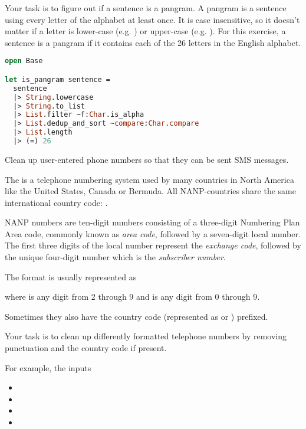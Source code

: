 Your task is to figure out if a sentence is a pangram.
A pangram is a sentence using every letter of the alphabet at least once.
It is case insensitive, so it doesn't matter if a letter is lower-case (e.g. ) or upper-case (e.g. ).
For this exercise, a sentence is a pangram if it contains each of the 26 letters in the English alphabet.

\begin{lstlisting}[language=OCaml]
open Base

let is_pangram sentence =
  sentence
  |> String.lowercase
  |> String.to_list
  |> List.filter ~f:Char.is_alpha
  |> List.dedup_and_sort ~compare:Char.compare
  |> List.length
  |> (=) 26
\end{lstlisting}

Clean up user-entered phone numbers so that they can be sent SMS messages.

The  is a telephone numbering system used by many countries in North America like the United States, Canada or Bermuda.
All NANP-countries share the same international country code: .

NANP numbers are ten-digit numbers consisting of a three-digit Numbering Plan Area code, commonly known as \textit{area code}, followed by a seven-digit local number.
The first three digits of the local number represent the \textit{exchange code}, followed by the unique four-digit number which is the \textit{subscriber number}.

The format is usually represented as


where  is any digit from 2 through 9 and  is any digit from 0 through 9.

Sometimes they also have the country code (represented as  or ) prefixed.

Your task is to clean up differently formatted telephone numbers by removing punctuation and the country code if present.

For example, the inputs

\begin{itemize}
  \item {}
  \item {}
  \item {}
  \item {}
\end{itemize}

